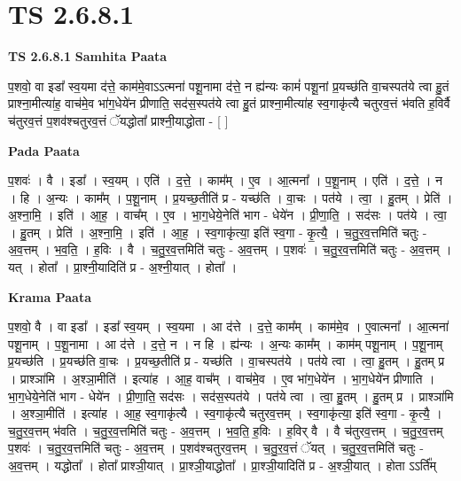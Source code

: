 \documentclass[17pt]{extarticle}
\begin{document}
\section*{ TS 2.6.8.1 }

\textbf{TS 2.6.8.1 } \newline
\textbf{Samhita Paata} \newline

प॒शवो॒ वा इडा᳚ स्व॒यमा द॑त्ते॒ काम॑मे॒वाऽऽत्मना॑ पशू॒नामा द॑त्ते॒ न ह्य॑न्यः कामं॑ पशू॒नां प्र॒यच्छ॑ति वा॒चस्पत॑ये त्वा हु॒तं प्राश्ना॒मीत्या॑ह॒ वाच॑मे॒व भा॑ग॒धेये॑न प्रीणाति॒ सद॑स॒स्पत॑ये त्वा हु॒तं प्राश्ना॒मीत्या॑ह स्व॒गाकृ॑त्यै चतुरव॒त्तं भ॑वति ह॒विर्वै च॑तुरव॒त्तं प॒शव॑श्चतुरव॒त्तं ॅयद्धोता᳚ प्राश्नी॒याद्धोता - [  ] \newline

\textbf{Pada Paata} \newline

प॒शवः॑ । वै । इडा᳚ । स्व॒यम् । एति॑ । द॒त्ते॒ । काम᳚म् । ए॒व । आ॒त्मना᳚ । प॒शू॒नाम् । एति॑ । द॒त्ते॒ । न । हि । अ॒न्यः । काम᳚म् । प॒शू॒नाम् । प्र॒यच्छ॒तीति॑ प्र - यच्छ॑ति । वा॒चः । पत॑ये । त्वा॒ । हु॒तम् । प्रेति॑ । अ॒श्ना॒मि॒ । इति॑ । आ॒ह॒ । वाच᳚म् । ए॒व । भा॒ग॒धेये॒नेति॑ भाग - धेये॑न । प्री॒णा॒ति॒ । सद॑सः । पत॑ये । त्वा॒ । हु॒तम् । प्रेति॑ । अ॒श्ना॒मि॒ । इति॑ । आ॒ह॒ । स्व॒गाकृ॑त्या॒ इति॑ स्व॒गा - कृ॒त्यै॒ । च॒तु॒र॒व॒त्तमिति॑ चतुः - अ॒व॒त्तम् । भ॒व॒ति॒ । ह॒विः । वै । च॒तु॒र॒व॒त्तमिति॑ चतुः - अ॒व॒त्तम् । प॒शवः॑ । च॒तु॒र॒व॒त्तमिति॑ चतुः - अ॒व॒त्तम् । यत् । होता᳚ । प्रा॒श्नी॒यादिति॑ प्र - अ॒श्नी॒यात् । होता᳚ ।  \newline


\textbf{Krama Paata} \newline

प॒शवो॒ वै । वा इडा᳚ । इडा᳚ स्व॒यम् । स्व॒यमा । आ द॑त्ते । द॒त्ते॒ काम᳚म् । काम॑मे॒व । ए॒वात्मना᳚ । आ॒त्मना॑ पशू॒नाम् । प॒शू॒नामा । आ द॑त्ते । द॒त्ते॒ न । न हि । ह्य॑न्यः । अ॒न्यः काम᳚म् । काम॑म् पशू॒नाम् । प॒शू॒नाम् प्र॒यच्छ॑ति । प्र॒यच्छ॑ति वा॒चः । प्र॒यच्छ॒तीति॑ प्र - यच्छ॑ति । वा॒चस्पत॑ये । पत॑ये त्वा । त्वा॒ हु॒तम् । हु॒तम् प्र । प्राश्ञा॑मि । अ॒श्ञा॒मीति॑ । इत्या॑ह । आ॒ह॒ वाच᳚म् । वाच॑मे॒व । ए॒व भा॑ग॒धेये॑न । भा॒ग॒धेये॑न प्रीणाति । भा॒ग॒धेये॒नेति॑ भाग - धेये॑न । प्री॒णा॒ति॒ सद॑सः । सद॑स॒स्पत॑ये । पत॑ये त्वा । त्वा॒ हु॒तम् । हु॒तम् प्र । प्राश्ञा॑मि । अ॒श्ञा॒मीति॑ । इत्या॑ह । आ॒ह॒ स्व॒गाकृ॑त्यै । स्व॒गाकृ॑त्यै चतुरव॒त्तम् । स्व॒गाकृ॑त्या॒ इति॑ स्व॒गा - कृ॒त्यै॒ । च॒तु॒र॒व॒त्तम् भ॑वति । च॒तु॒र॒व॒त्तमिति॑ चतुः - अ॒व॒त्तम् । भ॒व॒ति॒ ह॒विः । ह॒विर् वै । वै च॑तुरव॒त्तम् । च॒तु॒र॒व॒त्तम् प॒शवः॑ । च॒तु॒र॒व॒त्तमिति॑ चतुः - अ॒व॒त्तम् । प॒शव॑श्चतुरव॒त्तम् । च॒तु॒र॒व॒त्तं ॅयत् । च॒तु॒र॒व॒त्तमिति॑ चतुः - अ॒व॒त्तम् । यद्धोता᳚ । होता᳚ प्राश्ञी॒यात् । प्रा॒श्ञी॒याद्धोता᳚ । प्रा॒श्ञी॒यादिति॑ प्र - अ॒श्ञी॒यात् । होता ऽऽर्ति᳚म् \newline
\end{document}
